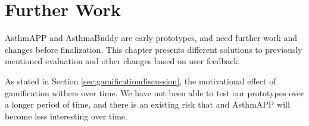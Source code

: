 \chapter{Further Work}
\label{chp:futurework}

AsthmAPP and AsthmaBuddy are early prototypes, and need further work and changes before finalization. This chapter presents different solutions to previously mentioned evaluation and other changes based on user feedback.

As stated in Section \ref{sec:gamificationdiscussion}, the motivational effect of gamification withers over time. We have not been able to test our prototypes over a longer period of time, and there is an existing risk that \buddy{} and AsthmAPP will become less interesting over time. 